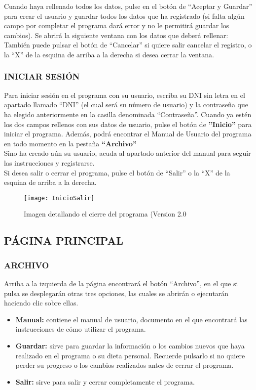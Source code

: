 Cuando haya rellenado todos los datos, pulse en el botón de “Aceptar y Guardar” para crear el usuario y guardar todos los datos que ha registrado (si falta algún campo por completar el programa dará error y no le permitirá guardar los cambios).
Se abrirá la siguiente ventana con los datos que deberá rellenar:
También puede pulsar el botón de “Cancelar” si quiere salir cancelar el registro, o la “X” de la esquina de arriba a la derecha si desea cerrar la ventana.
\subsubsection{INICIAR SESIÓN}
Para iniciar sesión en el programa con su usuario, escriba su DNI sin letra en el apartado llamado “DNI” (el cual será su número de usuario) y la contraseña que ha elegido anteriormente en la casilla denominada “Contraseña”. Cuando ya estén los dos campos rellenos con sus datos de usuario, pulse el botón de \textbf{''Inicio''} para iniciar el programa. Además, podrá encontrar el Manual de Usuario del programa en todo momento en la pestaña \textbf{``Archivo''}\\
Sino ha creado aún su usuario, acuda al apartado anterior del manual para seguir las instrucciones y registrarse.\\
Si desea salir o cerrar el programa, pulse el botón de “Salir” o la “X” de la esquina de arriba a la derecha.
\begin{figure}[htb]
\centering
\texttt{[image: InicioSalir]} 
\caption{Imagen detallando el cierre del programa (Version 2.0}
\end{figure}

\subsection{PÁGINA PRINCIPAL}
\subsubsection{ARCHIVO}
Arriba a la izquierda de la página encontrará el botón “Archivo”, en el que si pulsa se desplegarán otras tres opciones, las cuales se abrirán o ejecutarán haciendo clic sobre ellas.
\begin{itemize}
\item	\textbf{Manual:} contiene el manual de usuario, documento en el que encontrará las instrucciones de cómo utilizar el programa.
\item	\textbf{Guardar:} sirve para guardar la información o los cambios nuevos que haya realizado en el programa o su dieta personal. Recuerde pulsarlo si no quiere perder su progreso o los cambios realizados antes de cerrar el programa.
\item	\textbf{Salir:} sirve para salir y cerrar completamente el programa.
\end{itemize}
